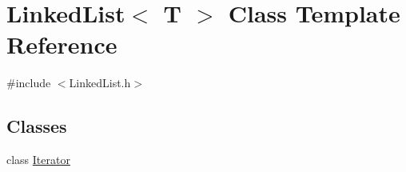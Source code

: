 \hypertarget{class_linked_list}{\section{Linked\-List$<$ T $>$ Class Template Reference}
\label{class_linked_list}
}


{\ttfamily \#include $<$Linked\-List.\-h$>$}

\subsection*{Classes}
\begin{DoxyCompactItemize}
\item 
class \hyperlink{class_linked_list_1_1_iterator}{Iterator}
\end{DoxyCompactItemize}
